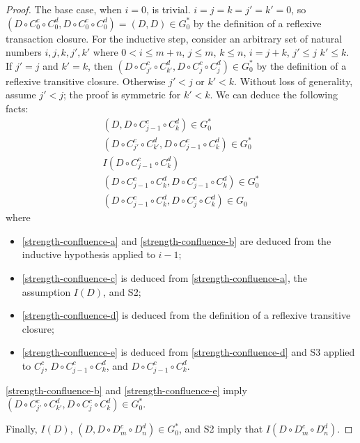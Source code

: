 \begin{proof}
  The base case, when $i = 0$, is trivial. $i = j = k = j' = k' = 0$, so $(D
  \circ C^c_0 \circ C^d_0, D \circ C^c_0 \circ C^d_0) = (D, D) \in G_0^*$ by
  the definition of a reflexive transaction closure.
  For the inductive step, consider an arbitrary set of natural numbers
  $i, j, k, j', k'$ where
    $0 < i \leq m + n$,
    $j \leq m$,
    $k \leq n$,
    $i = j + k$,
    $j' \leq j$
    $k' \leq k$.
  If $j' = j$ and $k' = k$, then $(D \circ C^c_{j'} \circ C^d_{k'}, D \circ
  C^c_{j} \circ C^d_{j}) \in G_0^*$ by the definition of a reflexive transitive
  closure. Otherwise $j' < j$ or $k' < k$. Without loss of generality, assume
  $j' < j$; the proof is symmetric for $k' < k$. We can deduce the following
  facts:
  \begin{gather}
    (D, D \circ C^c_{j-1} \circ C^d_{k}) \in G_0^*
      \label{strength-confluence-a} \\
    (D \circ C^c_{j'} \circ C^d_{k'}, D \circ C^c_{j-1} \circ C^d_{k}) \in G_0^*
      \label{strength-confluence-b} \\
    I(D \circ C^c_{j-1} \circ C^d_{k})
      \label{strength-confluence-c} \\
    (D \circ C^c_{j-1} \circ C^d_{k}, D \circ C^c_{j-1} \circ C^d_{k}) \in G_0^*
      \label{strength-confluence-d} \\
    (D \circ C^c_{j-1} \circ C^d_{k}, D \circ C^c_{j} \circ C^d_{k}) \in G_0
      \label{strength-confluence-e}
  \end{gather}
  where
  \begin{itemize}
    \item
      \eqref{strength-confluence-a} and \eqref{strength-confluence-b} are
      deduced from the inductive hypothesis applied to $i - 1$;
    \item
      \eqref{strength-confluence-c} is deduced from
      \eqref{strength-confluence-a}, the assumption $I(D)$, and S2;
    \item
      \eqref{strength-confluence-d} is deduced from the definition of a
      reflexive transitive closure;
    \item
      \eqref{strength-confluence-e} is deduced from
      \eqref{strength-confluence-d} and S3 applied to $C^c_j$, $D \circ
      C^c_{j-1} \circ C^d_{k}$, and $D \circ C^c_{j-1} \circ C^d_{k}$.
  \end{itemize}
  \eqref{strength-confluence-b} and \eqref{strength-confluence-e} imply
  $(D \circ C^c_{j'} \circ C^d_{k'}, D \circ C^c_j \circ C^d_k) \in G_0^*$.

  Finally, $I(D)$, $(D, D \circ D^c_m \circ D^d_n) \in G_0^*$, and S2 imply
  that $I(D \circ D^c_m \circ D^d_n)$.
\end{proof}

